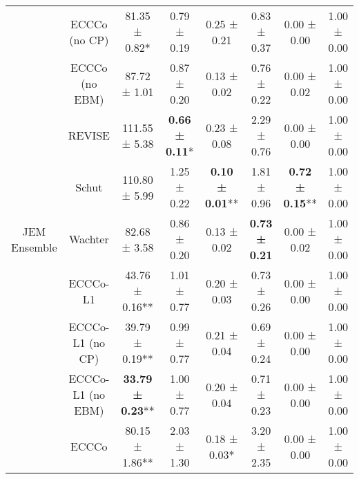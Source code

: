 \begin{table}
{\begin{tabular}[t]{cccccccc}
 & ECCCo (no CP) & 81.35 ± 0.82*\hphantom{*} & 0.79 ± 0.19\hphantom{*}\hphantom{*} & 0.25 ± 0.21\hphantom{*}\hphantom{*} & 0.83 ± 0.37\hphantom{*}\hphantom{*} & 0.00 ± 0.00\hphantom{*}\hphantom{*} & 1.00 ± 0.00\hphantom{*}\hphantom{*}\\

 & ECCCo (no EBM) & 87.72 ± 1.01\hphantom{*}\hphantom{*} & 0.87 ± 0.20\hphantom{*}\hphantom{*} & 0.13 ± 0.02\hphantom{*}\hphantom{*} & 0.76 ± 0.22\hphantom{*}\hphantom{*} & 0.00 ± 0.02\hphantom{*}\hphantom{*} & 1.00 ± 0.00\hphantom{*}\hphantom{*}\\

 & REVISE & 111.55 ± 5.38\hphantom{*}\hphantom{*} & \textbf{0.66 ± 0.11}*\hphantom{*} & 0.23 ± 0.08\hphantom{*}\hphantom{*} & 2.29 ± 0.76\hphantom{*}\hphantom{*} & 0.00 ± 0.00\hphantom{*}\hphantom{*} & 1.00 ± 0.00\hphantom{*}\hphantom{*}\\

 & Schut & 110.80 ± 5.99\hphantom{*}\hphantom{*} & 1.25 ± 0.22\hphantom{*}\hphantom{*} & \textbf{0.10 ± 0.01}** & 1.81 ± 0.96\hphantom{*}\hphantom{*} & \textbf{0.72 ± 0.15}** & 1.00 ± 0.00\hphantom{*}\hphantom{*}\\

\multirow[t]{-10}{*}{\centering\arraybackslash JEM Ensemble} & Wachter & 82.68 ± 3.58\hphantom{*}\hphantom{*} & 0.86 ± 0.20\hphantom{*}\hphantom{*} & 0.13 ± 0.02\hphantom{*}\hphantom{*} & \textbf{0.73 ± 0.21}\hphantom{*}\hphantom{*} & 0.00 ± 0.02\hphantom{*}\hphantom{*} & 1.00 ± 0.00\hphantom{*}\hphantom{*}\\
\cmidrule{1-8}
 & ECCCo-L1 & 43.76 ± 0.16** & 1.01 ± 0.77\hphantom{*}\hphantom{*} & 0.20 ± 0.03\hphantom{*}\hphantom{*} & 0.73 ± 0.26\hphantom{*}\hphantom{*} & 0.00 ± 0.00\hphantom{*}\hphantom{*} & 1.00 ± 0.00\hphantom{*}\hphantom{*}\\

 & ECCCo-L1 (no CP) & 39.79 ± 0.19** & 0.99 ± 0.77\hphantom{*}\hphantom{*} & 0.21 ± 0.04\hphantom{*}\hphantom{*} & 0.69 ± 0.24\hphantom{*}\hphantom{*} & 0.00 ± 0.00\hphantom{*}\hphantom{*} & 1.00 ± 0.00\hphantom{*}\hphantom{*}\\

 & ECCCo-L1 (no EBM) & \textbf{33.79 ± 0.23}** & 1.00 ± 0.77\hphantom{*}\hphantom{*} & 0.20 ± 0.04\hphantom{*}\hphantom{*} & 0.71 ± 0.23\hphantom{*}\hphantom{*} & 0.00 ± 0.00\hphantom{*}\hphantom{*} & 1.00 ± 0.00\hphantom{*}\hphantom{*}\\

 & ECCCo & 80.15 ± 1.86** & 2.03 ± 1.30\hphantom{*}\hphantom{*} & 0.18 ± 0.03*\hphantom{*} & 3.20 ± 2.35\hphantom{*}\hphantom{*} & 0.00 ± 0.00\hphantom{*}\hphantom{*} & 1.00 ± 0.00\hphantom{*}\hphantom{*}\\


\end{tabular}}
\end{table}
